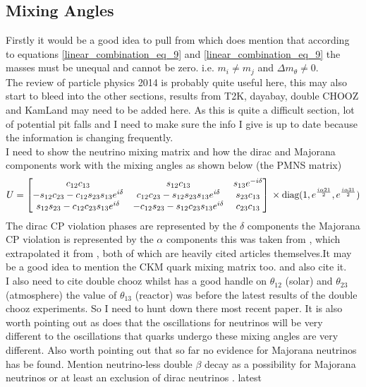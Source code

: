 \documentclass[12pt,a4paper]{article}
\begin{document}
\subsection{Mixing Angles}
Firstly it would be a good idea to pull from \cite{griffiths2008book}\cite{griffiths2008neutrinoOscillations} which does mention that according to equations \ref{linear_combination_eq_9} and \ref{linear_combination_eq_9} the masses must be unequal and cannot be zero. i.e. $m_i \neq m_j$ and $\Delta m_\theta \neq 0$. \\
The review of particle physics 2014 is probably quite useful here\cite{Olive_2014}, this may also start to bleed into the other sections, results from T2K, dayabay, double CHOOZ and KamLand may need to be added here. As this is quite a difficult section, lot of potential pit falls and I need to make sure the info I give is up to date because the information is changing frequently. 
\\I need to show the neutrino mixing matrix and how the dirac and Majorana components work with the mixing angles as shown below (the PMNS matrix) 
\begin{equation}
U
    =
    \begin{bmatrix}
        c_{12}c_{13} & s_{12}c_{13} & s_{13}e^{-i\delta}\\
        -s_{12}c_{23} - c_{12}s_{23}s_{13}e^{i\delta} & c_{12}c_{23} - s_{12}s_{23}s_{13}e^{i\delta} & s_{23}c_{13} \\
        s_{12}s_{23} - c_{12}c_{23}s_{13}e^{i\delta} & -c_{12}s_{23} - s_{12}c_{23}s_{13}e^{i\delta} & c_{23}c_{13} 
    \end{bmatrix}
    \\ \times \text{diag}(1, e^{\frac{i\alpha21}{2}} , e^{\frac{i\alpha31}{2}})
    \label{neutrino_mixing_matrix}
\end{equation}
The dirac CP violation phases are represented by the $\delta$ components the Majorana CP violation is represented by the $\alpha$ components this was taken from \cite{Olive_2014}, which extrapolated it from \cite{Bilenky_1980}, \cite{Schechter_and_Valle_1980} both of which are heavily cited articles themselves.It may be a good idea to mention the CKM quark mixing matrix too. and also cite it. 
\\I also need to cite double chooz whilst \cite{Olive_2014} has a good handle on $\theta_{12}$ (solar) and $\theta_{23}$ (atmosphere) the value of $\theta_{13}$ (reactor) was before the latest results of the double chooz experiments. So I need to hunt down there most recent paper. It is also worth pointing out as \cite{Olive_2014} does that the oscillations for neutrinos will be very different to the oscillations that quarks undergo these mixing angles are very different. Also worth pointing out that so far no evidence for Majorana neutrinos has be found. Mention neutrino-less double $\beta$ decay as a possibility for Majorana neutrinos or at least an exclusion of dirac neutrinos \cite{Schechter_and_Valle_1982}. latest 
\end{document}
